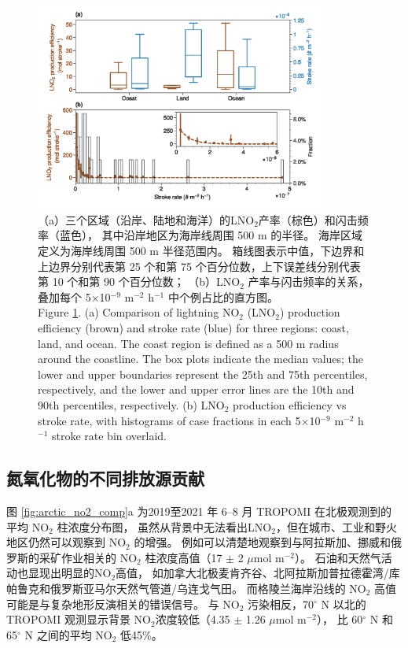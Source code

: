\begin{figure}[H]
\centering
\includegraphics[width=0.85\textwidth]{./figures/arctic_pe_rate.png}
\caption{
（a）三个区域（沿岸、陆地和海洋）的LNO$_2$产率（棕色）和闪击频率（蓝色），
其中沿岸地区为海岸线周围 500 m 的半径。
海岸区域定义为海岸线周围 500 m 半径范围内。
箱线图表示中值，下边界和上边界分别代表第 25 个和第 75 个百分位数，上下误差线分别代表第 10 个和第 90 个百分位数；
（b）LNO$_2$ 产率与闪击频率的关系，叠加每个 5$\times$10$^{-9}$ m$^{-2}$ h$^{-1}$ 中个例占比的直方图。 \\
Figure \ref{fig:arctic_pe_rate}. (a) Comparison of lightning NO$_2$ (LNO$_2$) production efficiency (brown) and stroke rate (blue) for three regions: coast, land, and ocean.
The coast region is defined as a 500 m radius around the coastline.
The box plots indicate the median values; the lower and upper boundaries represent the 25th and 75th percentiles, respectively, and the lower and upper error lines are the 10th and 90th percentiles, respectively.
(b) LNO$_2$ production efficiency vs stroke rate, with histograms of case fractions in each 5$\times$10$^{-9}$ m$^{-2}$ h$^{-1}$ stroke rate bin overlaid.
}
\label{fig:arctic_pe_rate}
\end{figure}


\subsection{氮氧化物的不同排放源贡献}


图 \ref{fig:arctic_no2_comp}a 为2019至2021 年 6--8 月 TROPOMI 在北极观测到的平均 NO$_2$ 柱浓度分布图，
虽然从背景中无法看出LNO$_2$，但在城市、工业和野火地区仍然可以观察到 NO$_2$ 的增强。
例如可以清楚地观察到与阿拉斯加、挪威和俄罗斯的采矿作业相关的 NO$_2$ 柱浓度高值（17 $\pm$ 2 $\mu$mol m$^{-2}$）。
石油和天然气活动也显现出明显的NO$_2$高值，
如加拿大北极麦肯齐谷、北阿拉斯加普拉德霍湾/库帕鲁克和俄罗斯亚马尔天然气管道/乌连戈气田\citep{VanDerA.2020}。
而格陵兰海岸沿线的 NO$_2$ 高值可能是与复杂地形反演相关的错误信号\citep{Hachmeister.2022}。
与 NO$_2$ 污染相反，70$^{\circ}$ N 以北的 TROPOMI 观测显示背景 NO$_2$浓度较低（4.35 $\pm$ 1.26 $\mu$mol m$^{-2}$），
比 60$^{\circ}$ N 和 65$^{\circ}$ N 之间的平均 NO$_2$ 低45\%。

